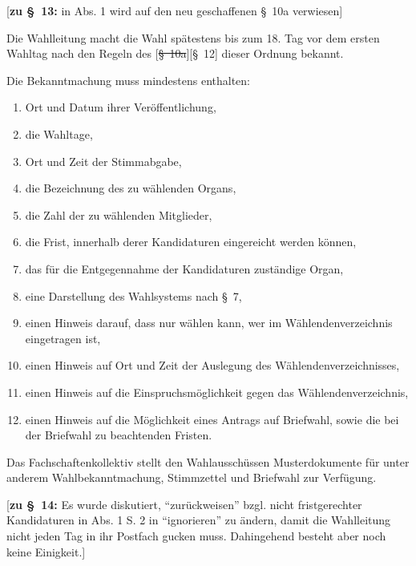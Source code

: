 \documentclass[%
draft,%
multilinesections%
]{fswo}
\newcommand\oldT[1]  {{\color{Gray}[\st{#1}]}}
\newcommand\newT[1]  {{\color{Green}[#1]}}
\newcommand\bemFr[1] {{\color{Red}[#1]}}
\newcommand\oldT[1]{}%
\newcommand\newT[1]{#1}
\newcommand\bemFr[1]{}%
\newcommand\change[2]{\oldT{#1}\newT{#2}}
\begin{document}
\bemFr{\textbf{zu \S~13:} in Abs. 1 wird auf den neu geschaffenen \S~10a verwiesen}
\begin{contract}
Die Wahlleitung macht die Wahl spätestens bis zum 18. Tag vor dem ersten Wahltag nach den Regeln des \change{\S~10a}{\S~12} dieser Ordnung bekannt. %

Die Bekanntmachung muss mindestens enthalten:
\begin{enumerate}
\item Ort und Datum ihrer Veröffentlichung,
\item die Wahltage,
\item Ort und Zeit der Stimmabgabe,
\item die Bezeichnung des zu wählenden Organs,
\item die Zahl der zu wählenden Mitglieder,
\item die Frist, innerhalb derer Kandidaturen eingereicht werden können,
\item das für die Entgegennahme der Kandidaturen zuständige Organ,
\item eine Darstellung des Wahlsystems nach \S~7, %
\item einen Hinweis darauf, dass nur wählen kann, wer im Wählendenverzeichnis eingetragen ist,
\item einen Hinweis auf Ort und Zeit der Auslegung des Wählendenverzeichnisses,
\item einen Hinweis auf die Einspruchsmöglichkeit gegen das Wählendenverzeichnis,
\item einen Hinweis auf die Möglichkeit eines Antrags auf Briefwahl, sowie die bei der Briefwahl zu beachtenden Fristen.
\end{enumerate}

Das Fachschaftenkollektiv stellt den Wahlausschüssen Musterdokumente für unter anderem Wahlbekanntmachung, Stimmzettel und Briefwahl zur Verfügung.
\end{contract}

\bemFr{\textbf{zu \S~14:} Es wurde diskutiert, \enquote{zurückweisen} bzgl. nicht fristgerechter Kandidaturen in Abs. 1 S. 2 in \enquote{ignorieren} zu ändern, damit die Wahlleitung nicht jeden Tag in ihr Postfach gucken muss.
Dahingehend besteht aber noch keine Einigkeit.}
\end{document}
